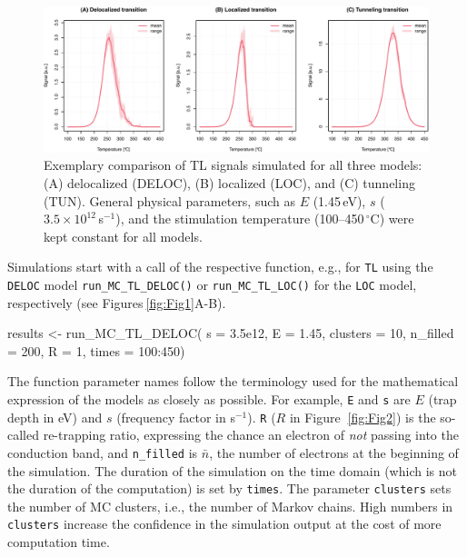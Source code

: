 \begin{Schunk}
\begin{figure}

{\centering \includegraphics[width=140mm]{figures/Fig4-1} 

}

\caption{Exemplary comparison of TL signals simulated for all three  models: (A) delocalized (DELOC), (B) localized (LOC), and (C) tunneling (TUN). General physical parameters, such as $E$ (1.45$\,$eV), $s$ ($3.5\times10^{12}\,$s$^{-1}$), and the stimulation temperature (100--450$\,^{\circ}$C) were kept constant for all models.}\label{fig:Fig4}
\end{figure}
\end{Schunk}

Simulations start with a call of the respective function, e.g., for
\texttt{TL} using the \texttt{DELOC} model \texttt{run\_MC\_TL\_DELOC()}
or \texttt{run\_MC\_TL\_LOC()} for the \texttt{LOC} model, respectively
(see Figures\(~\)\ref{fig:Fig1}A-B).

\begin{Schunk}
\begin{Sinput}
results <- run_MC_TL_DELOC(
 s = 3.5e12,
 E = 1.45,
 clusters = 10,
 n_filled = 200,
 R = 1,
 times = 100:450)
\end{Sinput}
\end{Schunk}

The function parameter names follow the terminology used for the
mathematical expression of the models as closely as possible. For
example, \texttt{E} and \texttt{s} are \(E\) (trap depth in eV) and
\(s\) (frequency factor in s\(^{-1}\)). \texttt{R} (\(R\) in Figure\(~\)
\ref{fig:Fig2}) is the so-called re-trapping ratio, expressing the
chance an electron of \emph{not} passing into the conduction band, and
\texttt{n\_filled} is \(\bar{n}\), the number of electrons at the
beginning of the simulation. The duration of the simulation on the time
domain (which is not the duration of the computation) is set by
\texttt{times}. The parameter \texttt{clusters} sets the number of MC
clusters, i.e., the number of Markov chains. High numbers in
\texttt{clusters} increase the confidence in the simulation output at
the cost of more computation time.

